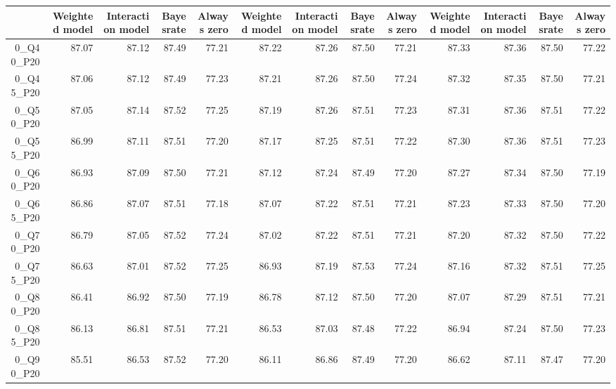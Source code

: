 \begin{table}[ht]
\centering
\begin{tabular}{rrrrrrrrrrrrr}
  \hline
 & Weighted model & Interaction model & Bayesrate & Always zero & Weighted model & Interaction model & Bayesrate & Always zero & Weighted model & Interaction model & Bayesrate & Always zero \\ 
  \hline
0\_Q40\_P20 & 87.07 & 87.12 & 87.49 & 77.21 & 87.22 & 87.26 & 87.50 & 77.21 & 87.33 & 87.36 & 87.50 & 77.22 \\ 
  0\_Q45\_P20 & 87.06 & 87.12 & 87.49 & 77.23 & 87.21 & 87.26 & 87.50 & 77.24 & 87.32 & 87.35 & 87.50 & 77.21 \\ 
  0\_Q50\_P20 & 87.05 & 87.14 & 87.52 & 77.25 & 87.19 & 87.26 & 87.51 & 77.23 & 87.31 & 87.36 & 87.51 & 77.22 \\ 
  0\_Q55\_P20 & 86.99 & 87.11 & 87.51 & 77.20 & 87.17 & 87.25 & 87.51 & 77.22 & 87.30 & 87.36 & 87.51 & 77.23 \\ 
  0\_Q60\_P20 & 86.93 & 87.09 & 87.50 & 77.21 & 87.12 & 87.24 & 87.49 & 77.20 & 87.27 & 87.34 & 87.50 & 77.19 \\ 
  0\_Q65\_P20 & 86.86 & 87.07 & 87.51 & 77.18 & 87.07 & 87.22 & 87.51 & 77.21 & 87.23 & 87.33 & 87.50 & 77.20 \\ 
  0\_Q70\_P20 & 86.79 & 87.05 & 87.52 & 77.24 & 87.02 & 87.22 & 87.51 & 77.21 & 87.20 & 87.32 & 87.50 & 77.22 \\ 
  0\_Q75\_P20 & 86.63 & 87.01 & 87.52 & 77.25 & 86.93 & 87.19 & 87.53 & 77.24 & 87.16 & 87.32 & 87.51 & 77.25 \\ 
  0\_Q80\_P20 & 86.41 & 86.92 & 87.50 & 77.19 & 86.78 & 87.12 & 87.50 & 77.20 & 87.07 & 87.29 & 87.51 & 77.21 \\ 
  0\_Q85\_P20 & 86.13 & 86.81 & 87.51 & 77.21 & 86.53 & 87.03 & 87.48 & 77.22 & 86.94 & 87.24 & 87.50 & 77.23 \\ 
  0\_Q90\_P20 & 85.51 & 86.53 & 87.52 & 77.20 & 86.11 & 86.86 & 87.49 & 77.20 & 86.62 & 87.11 & 87.47 & 77.20 \\ 
   \hline
\end{tabular}
\end{table}
